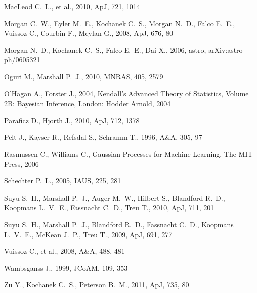 \documentclass[useAMS,usenatbib, a4paper]{mn2e} \usepackage{natbib}
\begin{document}
\begin{thebibliography}{99}
 MacLeod C.~L., et al., 2010, ApJ, 721, 
1014 

Morgan C.~W., Eyler M.~E., Kochanek C.~S., Morgan N.~D., Falco E.~E., 
Vuissoz C., Courbin F., Meylan G., 2008, ApJ, 676, 80 

Morgan N.~D., Kochanek C.~S., Falco E.~E., Dai X., 2006, astro, 
arXiv:astro-ph/0605321 

 Oguri M., Marshall P.~J., 2010, MNRAS, 405, 2579 

 O'Hagan A., Forster J., 2004, Kendall's Advanced Theory of Statistics, Volume 2B: Bayesian Inference, London: Hodder Arnold, 2004

 Paraficz D., Hjorth J., 2010, ApJ, 712, 1378 

 Pelt J., Kayser R., Refsdal S., Schramm T., 1996, A\&A, 305, 97 

 Rasmussen C., Williams C., Gaussian Processes for Machine Learning, The MIT Press, 2006

Schechter P.~L., 2005, IAUS, 225, 281 

Suyu S.~H., Marshall P.~J., Auger M.~W., Hilbert S., Blandford R.~D., 
Koopmans L.~V.~E., Fassnacht C.~D., Treu T., 2010, ApJ, 711, 201 

Suyu S.~H., Marshall P.~J., Blandford R.~D., Fassnacht C.~D., Koopmans 
L.~V.~E., McKean J.~P., Treu T., 2009, ApJ, 691, 277 

 Vuissoz C., et al., 2008, A\&A, 488, 481 

Wambsganss J., 1999, JCoAM, 109, 353 

 Zu Y., Kochanek C.~S., Peterson B.~M., 2011, ApJ, 735, 80 
\end{thebibliography}
\end{document}

